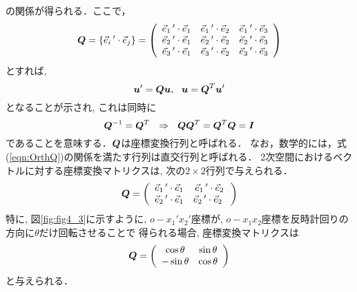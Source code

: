 \documentclass[10pt,a4j]{jbook}
\begin{document}
の関係が得られる．ここで，
\begin{equation}
	\mbox{\boldmath $Q$}=
	\left\{
		\vec{e}_i\,'\cdot \vec{e}_j
	\right\}
	=
	\left( 
	\begin{array}{ccc}
		\vec{e}_1\,'\cdot \vec{e}_1 & \vec{e}_1\,'\cdot \vec{e}_2 & \vec{e}_1\,'\cdot \vec{e}_3 \\
		\vec{e}_2\,'\cdot \vec{e}_1 & \vec{e}_2\,'\cdot \vec{e}_2 & \vec{e}_2\,'\cdot \vec{e}_3 \\
		\vec{e}_3\,'\cdot \vec{e}_1 & \vec{e}_3\,'\cdot \vec{e}_2 & \vec{e}_3\,'\cdot \vec{e}_3 
	\end{array}
	\right)
\end{equation}
とすれば, 
\begin{equation}
	\fat{u}'=\fat{Q}\fat{u}, \ \ 
	\fat{u}=\fat{Q}^T\fat{u}'
\end{equation}
となることが示され, これは同時に
\begin{equation}
	\fat{Q}^{-1}=\fat{Q}^{T} \ \ \Rightarrow \ \ \fat{QQ}^T=\fat{Q}^T\fat{Q}=\fat{I}
	\label{eqn:OrthQ}
\end{equation}
であることを意味する．$\mbox{\boldmath $Q$}$は座標変換行列と呼ばれる．
なお，数学的には，式(\ref{eqn:OrthQ})の関係を満たす行列は直交行列と呼ばれる．
2次空間におけるベクトルに対する座標変換マトリクスは, 次の$2\times 2$行列で与えられる．
\begin{equation}
	\mbox{\boldmath $Q$}=
	\left( 
	\begin{array}{cc}
		\vec{e}_1\,'\cdot \vec{e}_1 & \vec{e}_1\,'\cdot \vec{e}_2 \\
		\vec{e}_2\,'\cdot \vec{e}_1 & \vec{e}_2\,'\cdot \vec{e}_2 \
	\end{array}
	\right)
\end{equation}
特に, 図\ref{fig:fig4_3}に示すように, $o-x_1'x_2'$座標が, $o-x_1x_2$座標を反時計回りの方向に$\theta$だけ回転させることで
得られる場合, 座標変換マトリクスは
\begin{equation}
	\mbox{\boldmath $Q$}=
	\left( 
	\begin{array}{cc}
		 \cos \theta & \sin \theta \\
		-\sin \theta & \cos \theta 
	\end{array}
	\right)
	\label{eqn:Qth}
\end{equation}
と与えられる．
\end{document}
